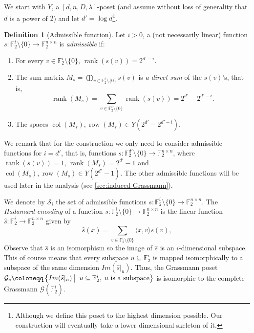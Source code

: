 \documentclass[10pt,a4paper]{article}
\newcommand{\prettyref}[1]{\cref{#1}}
\theoremstyle{definition}
\newtheorem{definition}[theorem]{Definition}
\theoremstyle{remark}
\newcommand\sett[2]{\left\{ #1 \left| \; \vphantom{#1 #2} \right. #2  \right\}}
\newcommand{\set}[1]{\{#1\}}
\newcommand{\iprod}[1]{\langle#1\rangle}
\newcommand{\F}{\mathbb{F}}
\DeclareMathOperator{\rank}{rank}
\DeclareMathOperator{\row}{row}
\DeclareMathOperator{\col}{col}
\numberwithin{equation}{section}
\let\pref=\prettyref
\def\Y{Y}
\def\diml{d}
\def\dimlin{{\diml}}
\def\dimloutfull{{\diml'}}
\def\lambdai{\lambda}
\def\degree{D}
\begin{document}
We start with \(Y\), a \([\dimlin,n,\degree,\lambdai]\)-poset (and assume without loss of generality that \(\dimlin\) is a power of \(2\)) and let \(\dimloutfull = \log \dimlin\)\footnote{Although we define this poset to the highest dimension possible. Our construction will eventually take a lower dimensional skeleton of it.}.
\begin{definition}[Admissible function] \label{def:admissible-func}
Let \(i > 0\), a (not necessarily linear) function \(s: \F_2^{i} \setminus \set{0} \to \F_2^{n \times n}\) is \emph{admissible} if:
    \begin{enumerate}
        \item For every \(v \in \F_2^i \setminus \set{0}\), \(\rank(s(v)) = 2^{\dimloutfull-i}\).
        \item The sum matrix \(M_s = \bigoplus_{v \in \F_2^i \setminus \set{0}}s(v)\) is \emph{a direct sum} of the \(s(v)\)'s, that is, \[\rank(M_s) = \sum_{v \in \F_2^i \setminus \set{0}} \rank(s(v)) = 2^{\dimloutfull}-2^{\dimloutfull-i}.\]
        \item The spaces \(\col(M_s), \row(M_s) \in \Y(2^{\dimloutfull}-2^{\dimloutfull-i})\). %
    \end{enumerate}
\end{definition}
We remark that for the construction we only need to consider admissible functions for \(i=\dimloutfull\), that is, functions \(s: \F_2^{\dimloutfull} \setminus \set{0} \to \F_2^{n \times n}\), where \(\rank(s(v))=1\), \(\rank(M_s) = 2^{\dimloutfull}-1\) and \(\col(M_s),\row(M_s) \in \Y(2^{\dimloutfull}-1)\). The other admissible functions will be used later in the analysis (see \pref{sec:induced-Grassmann}).


We denote by \(\mathcal{S}_i\) the set of admissible functions \(s: \F_2^{i} \setminus \set{0} \to \F_2^{n \times n}\). The \emph{Hadamard encoding} of a function \(s: \F_2^{i} \setminus \set{0} \to \F_2^{n \times n}\) is the linear function \(\widehat{s}:\F_2^i \to \F_2^{n \times n}\) given by
\[\widehat{s}(x) = \sum_{v \in \F_2^i \setminus \set{0}} \iprod{x,v} s(v),\]
Observe that \(\widehat{s}\) is an isomorphism so the image of \(\widehat{s}\) is an \(i\)-dimensional subspace. This of course means that every subspace \(u \subseteq \F_2^{i}\) is mapped isomorphically to a subspace of the same dimension \(Im(\widehat{s}|_u)\). Thus, the Grassmann poset \(\mathcal{G}_{s} \coloneqq \sett{Im(\widehat{s}|_u)}{u \subseteq \F_2^i, \; u \text{ is a subspace}}\) is isomorphic to the complete Grassmann \(\mathcal{G}(\F_2^i)\). 
\end{document}
